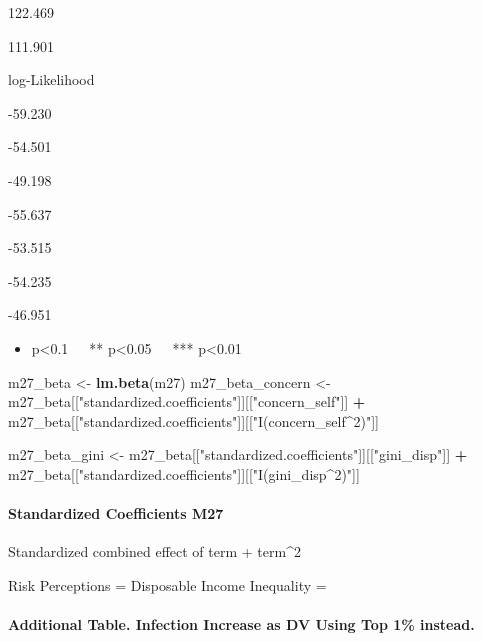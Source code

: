 \documentclass[
]{article}
\newenvironment{Shaded}{\begin{snugshade}}{\end{snugshade}}
\newcommand{\KeywordTok}[1]{\textcolor[rgb]{0.13,0.29,0.53}{\textbf{#1}}}
\newcommand{\NormalTok}[1]{#1}
\newcommand{\OperatorTok}[1]{\textcolor[rgb]{0.81,0.36,0.00}{\textbf{#1}}}
\newcommand{\StringTok}[1]{\textcolor[rgb]{0.31,0.60,0.02}{#1}}
\providecommand{\tightlist}{%
  \setlength{\itemsep}{0pt}\setlength{\parskip}{0pt}}
\begin{document}
122.469

111.901

log-Likelihood

-59.230

-54.501

-49.198

-55.637

-53.515

-54.235

-46.951

\begin{itemize}
\tightlist
\item
  p\textless0.1~~~** p\textless0.05~~~*** p\textless0.01
\end{itemize}

\begin{Shaded}
\begin{Highlighting}[]
\NormalTok{m27_beta <-}\StringTok{ }\KeywordTok{lm.beta}\NormalTok{(m27)}
\NormalTok{m27_beta_concern <-}\StringTok{ }\NormalTok{m27_beta[[}\StringTok{"standardized.coefficients"}\NormalTok{]][[}\StringTok{"concern_self"}\NormalTok{]] }\OperatorTok{+}\StringTok{ }\NormalTok{m27_beta[[}\StringTok{"standardized.coefficients"}\NormalTok{]][[}\StringTok{"I(concern_self^2)"}\NormalTok{]]}

\NormalTok{m27_beta_gini <-}\StringTok{ }\NormalTok{m27_beta[[}\StringTok{"standardized.coefficients"}\NormalTok{]][[}\StringTok{"gini_disp"}\NormalTok{]] }\OperatorTok{+}\StringTok{ }\NormalTok{m27_beta[[}\StringTok{"standardized.coefficients"}\NormalTok{]][[}\StringTok{"I(gini_disp^2)"}\NormalTok{]]}
\end{Highlighting}
\end{Shaded}

\hypertarget{standardized-coefficients-m27}{%
\paragraph{Standardized Coefficients
M27}\label{standardized-coefficients-m27}}

Standardized combined effect of term + term\^{}2

Risk Perceptions = Disposable Income Inequality =

\hypertarget{additional-table.-infection-increase-as-dv-using-top-1-instead.}{%
\paragraph{Additional Table. Infection Increase as DV Using Top 1\%
instead.}\label{additional-table.-infection-increase-as-dv-using-top-1-instead.}}
\end{document}
